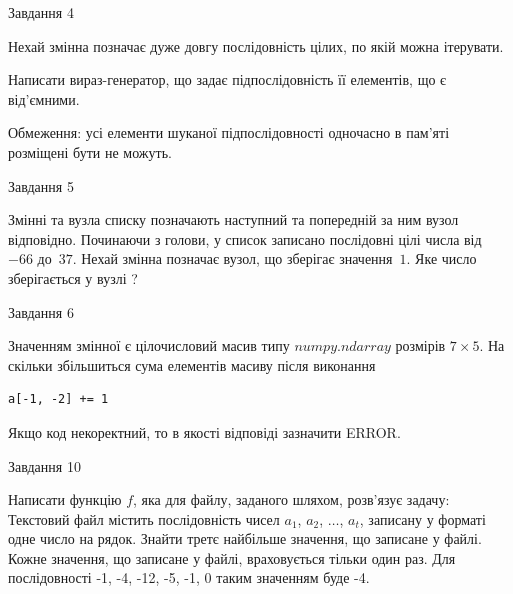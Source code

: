 \documentclass[12pt, ukrainian]{article}
\begin{document}
{\begin{minipage}[t]{8.0cm}
\end{minipage}


               
{\begin{center}Завдання {4}\end{center}}
\vspace{-4mm}
Нехай змінна  позначає дуже довгу послідовність цілих, по якій можна ітерувати.

Написати вираз-генератор, що задає підпослідовність її елементів, що є від'єм\-ни\-ми.

Обмеження: усі елементи шуканої підпослідовності одночасно в пам'яті розміщені бути не можуть.\par

\vspace{10mm}
               
{\begin{center}Завдання {5}\end{center}}
\vspace{-4mm}
Змінні  та  вузла списку позначають наступний та попередній за ним вузол відповідно. Починаючи з голови, у список записано послідовні цілі числа від~$-66$ до~$37$. Нехай змінна  позначає вузол, що зберігає значення~$1$.
Яке число зберігається у вузлі  ?\par

               
{\begin{center}Завдання {6}\end{center}}
\vspace{-4mm}
Значенням змінної  є цілочисловий масив типу $numpy.ndarray$ розмірів $7{\times}5$. На скільки збільшиться сума елементів масиву  після виконання
\begin{verbatim}
a[-1, -2] += 1
\end{verbatim}


Якщо код некоректний, то в якості відповіді зазначити ERROR.\par

               
{\begin{center}Завдання {10}\end{center}}
\vspace{-4mm}

Написати функцію $f$, яка для файлу, заданого шляхом, розв’язує задачу:\\ Текстовий файл містить послідовність чисел $a_1$, $a_2$, $\ldots$, $a_t$, записану у форматі одне число на рядок. Знайти третє найбільше значення, що записане у файлі. Кожне значення, що записане у файлі, враховується тільки один раз. Для послідовності -1, -4, -12, -5, -1, 0 таким значенням буде -4.

}
\end{document}
